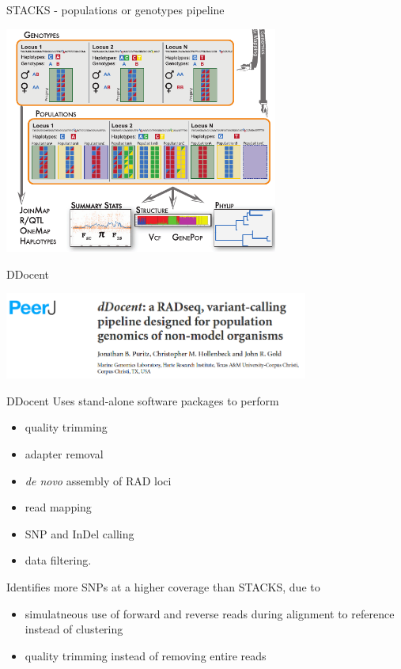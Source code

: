 \documentclass[presentation]{beamer}
\begin{document}
\begin{frame}[label=sec-4-1-6]{STACKS - populations or genotypes pipeline}
\begin{center}
\includegraphics[width=9cm]{Catchen2013Fig1b.png}

\tiny{\citep{Catchen2013a}}
\end{center}
\end{frame}


\begin{frame}[label=sec-4-1-7]{DDocent \citep{Puritz2014}}
\begin{center}

\includegraphics[width=10cm]{dDocent.png}

\end{center}
\end{frame}

\begin{frame}[label=sec-4-1-8]{DDocent \citep{Puritz2014}}
Uses stand-alone software packages to perform
\begin{itemize}
\item quality trimming
\item adapter removal
\item \emph{de novo} assembly of RAD loci
\item read mapping
\item SNP and InDel calling
\item data filtering.
\end{itemize}

Identifies more SNPs at a higher coverage than STACKS, due to 
\begin{itemize}
\item simulatneous use of forward and reverse reads during alignment to
reference instead of clustering
\item quality trimming instead of removing entire reads
\end{itemize}
\end{frame}
\end{document}
